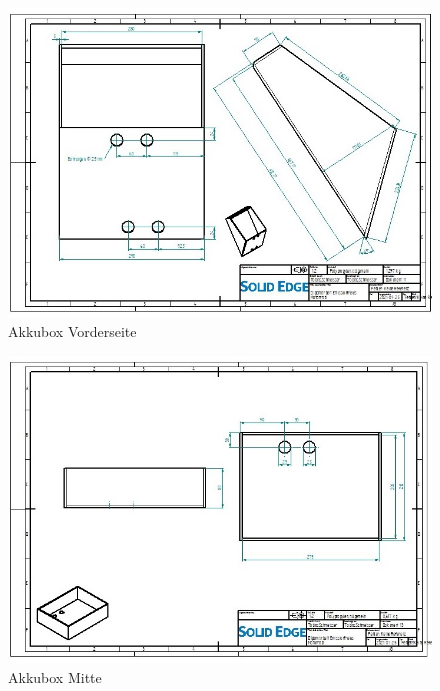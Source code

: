 \begin{figure} [H]
	\begin{center}
		\includegraphics[angle=90]{figures/mechanik/Box_2_Zeichnung.jpg}
		\caption{Akkubox Vorderseite}
		\label{fig:Akkubox Vorderseite}
	\end{center}
\end{figure}

\begin{figure} [H]
	\begin{center}
		\includegraphics[angle=90]{figures/mechanik/Box_3_Zeichnung.jpg}
		\caption{Akkubox Mitte}
		\label{fig:Akkubox Mitte}
	\end{center}
\end{figure}

